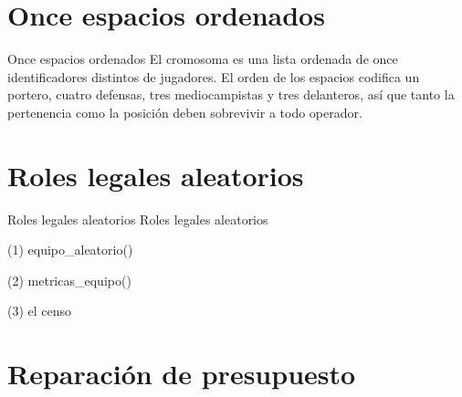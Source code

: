 \section{Once espacios ordenados}

\begin{frame}{Once espacios ordenados}
El cromosoma es una lista ordenada de once identificadores distintos de jugadores. El orden
de los espacios codifica un portero, cuatro defensas, tres mediocampistas y tres
delanteros, así que tanto la pertenencia como la posición deben sobrevivir a todo operador.
\end{frame}


\section{Roles legales aleatorios}

\begin{frame}{Roles legales aleatorios}
Roles legales aleatorios
\end{frame}

\begin{frame}[fragile]{(1) equipo\_aleatorio()}

\end{frame}

\begin{frame}[fragile]{(2) metricas\_equipo()}

\end{frame}

\begin{frame}[fragile]{(3) el censo}

\end{frame}


\section{Reparación de presupuesto}

